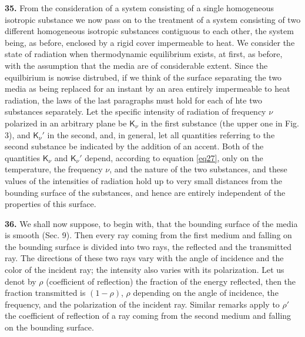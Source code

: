 \documentclass[12pt,oneside]{book}
\begin{document}
\textbf{35.} From the consideration of a system consisting of a single homogeneous isotropic substance we now pass on to the treatment of a system consisting of two different homogeneous isotropic substances contiguous to each other, the system being, as before, enclosed by a rigid cover impermeable to heat. We consider the state of radiation when thermodynamic equilibrium exists, at first, as before, with the assumption that the media are of considerable extent. Since the equilbirium is nowise distrubed, if we think of the surface separating the two media as being replaced for an instant by an area entirely impermeable to heat radiation, the laws of the last paragraphs must hold for each of hte two substances separately. Let the specific intensity of radiation of frequency $\nu$ polarized in an arbitrary plane be $\mathsf{K}_\nu$ in the first substance (the upper one in Fig. 3), and $\mathsf{K}_\nu'$ in the second, and, in general, let all quantities referring to the second substance be indicated by the addition of an accent. Both of the quantities $\mathsf{K}_\nu$ and $\mathsf{K}_\nu'$ depend, according to equation \eqref{eq27}, only on the temperature, the frequency $\nu$, and the nature of the two substances, and these values of the intensities of radiation hold up to very small distances from the bounding surface of the substances, and hence are entirely independent of the properties of this surface. \par

\textbf{36.} We shall now suppose, to begin with, that the bounding surface of the media is smooth (Sec. 9). Then every ray coming from the first medium and falling on the bounding surface is divided into two rays, the reflected and the transmitted ray. The directions of these two rays vary with the angle of incidence and the color of the incident ray; the intensity also varies with its polarization. Let us denot by $\rho$ (coefficient of reflection) the fraction of the energy reflected, then the fraction transmitted is $(1-\rho)$, $\rho$ depending on the angle of incidence, the frequency, and the polarization of the incident ray. Similar remarks apply to $\rho'$ the coefficient of reflection of a ray coming from the second medium and falling on the bounding surface. \par
\end{document}
